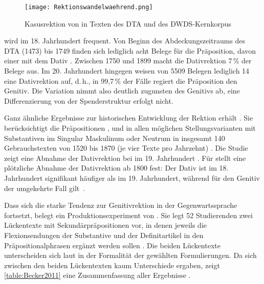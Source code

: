 \begin{figure}
\centering
\texttt{[image: Rektionswandelwaehrend.png]}
\caption{Kasusrektion von \waehrend{} in Texten des DTA und des DWDS-Kernkorpus \citep[s.][]{Vieregge.2019}}
\label{pic:Rektionswandelwaehrend}
\end{figure}

 wird im 18. Jahrhundert frequent. Von Beginn des Abdeckungszeitraums des DTA (1473) bis 1749 finden sich lediglich acht Belege für die Präposition, davon einer mit dem Dativ \citep[s.][]{Vieregge.2019}.
Zwischen 1750 und 1899 macht die Dativrektion 7\,\% der Belege aus. 
Im 20. Jahrhundert hingegen weisen von 5509 Belegen lediglich 14 eine Dativrektion auf, d.\,h., in 99,7\,\% der Fälle regiert die Präposition den Genitiv. 
Die Variation nimmt also deutlich zugunsten des Genitivs ab, eine Differenzierung von der Spenderstruktur erfolgt nicht. 

Ganz ähnliche Ergebnisse zur historischen Entwicklung der Rektion erhält \citet[]{Sato.2015}. 
Sie berücksichtigt die Präpositionen \wegen, \waehrend{} und  in allen möglichen Stellungsvarianten mit Substantiven im Singular Maskulinum oder Neutrum in insgesamt 140 Gebrauchstexten von 1520 bis 1870 (je vier Texte pro Jahrzehnt) \citep[s.][30]{Sato.2015}. 
Die Studie zeigt eine Abnahme der Dativrektion bei  im 19. Jahrhundert \citep[s.][45--46]{Sato.2015}.
Für \wegen{}  stellt \citet[33]{Sato.2015} eine pl{\"o}tzliche Abnahme der Dativrektion ab 1800 fest: 
Der Dativ ist im 18. Jahrhundert signifikant h{\"a}ufiger als im 19. Jahrhundert, w{\"a}hrend f{\"u}r den Genitiv der umgekehrte Fall gilt~\citep[s.][34]{Sato.2015}.

Dass sich die starke Tendenz zur Genitivrektion in der Gegenwartssprache fortsetzt, belegt ein Produktionsexperiment von \citet[]{Becker2011}. 
Sie legt 52 Studierenden zwei Lückentexte mit Sekundärpräpositionen vor, in denen jeweils die Flexionsendungen der Substantive und der Definitartikel in den Präpositionalphrasen ergänzt werden sollen \citep[s.][209]{Becker2011}. 
Die beiden Lückentexte unterscheiden sich laut \citet[209--210]{Becker2011} in der Formalität der gewählten Formulierungen. 
Da sich zwischen den beiden Lückentexten kaum Unterschiede ergaben, zeigt \autoref{table:Becker2011} eine Zusammenfassung aller Ergebnisse \citep[s.][210]{Becker2011}. 


